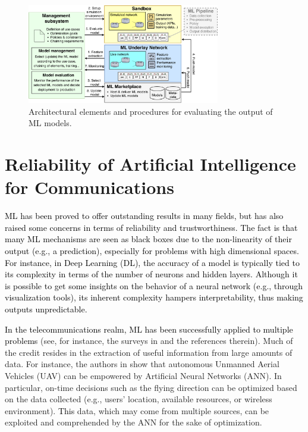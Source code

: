 \documentclass[journal]{IEEEtran}
\begin{document}
	\begin{figure}[ht!]
		\centering
		\includegraphics[width=0.75\textwidth]{architecture_example.pdf}
		\caption{Architectural elements and procedures for evaluating the output of ML models.}
		\label{fig:example_simulator}
	\end{figure}
		
	\section{Reliability of Artificial Intelligence for Communications}
	
	\textcolor{black}{ML has been proved to offer outstanding results in many fields, but has also raised some concerns in terms of reliability and trustworthiness. The fact is that many ML mechanisms are seen as black boxes due to the non-linearity of their output (e.g., a prediction), especially for problems with high dimensional spaces. For instance, in Deep Learning (DL), the accuracy of a model is typically tied to its complexity in terms of the number of neurons and hidden layers. Although it is possible to get some insights on the behavior of a neural network (e.g., through visualization tools), its inherent complexity hampers interpretability, thus making outputs unpredictable.}
	
	\textcolor{black}{In the telecommunications realm, ML has been successfully applied to multiple problems} (see, for instance, the surveys in \cite{survey2,survey3,survey4,survey5,survey6} and the references therein). Much of the credit resides in the extraction of useful information from large amounts of data. For instance, the authors in \cite{survey4} show that autonomous Unmanned Aerial Vehicles (UAV) can be empowered by Artificial Neural Networks (ANN). In particular, on-time decisions such as the flying direction can be optimized based on the data collected (e.g., users' location, available resources, or wireless environment). \textcolor{black}{This} data, which may come from multiple sources, can be exploited and comprehended by the ANN for the sake of optimization.
	
\end{document}
